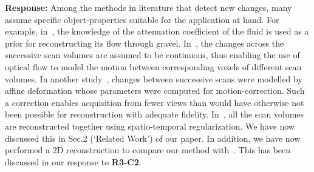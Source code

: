 \documentclass{article}
\begin{document}
\textbf{Response:} Among the methods in literature that detect new changes, many assume specific object-properties suitable for the application at hand.  For example, in~\cite{Van2015}, the knowledge of the attenuation coefficient of the fluid is used as a prior for reconstructing its flow through gravel. In~\cite{koen2020}, the changes across the successive scan volumes are assumed to be continuous, thus enabling the use of optical flow to model the motion between corresponding voxels of different scan volumes. In another study~\cite{vincent2017}, changes between successive scans were modelled by affine deformation whose parameters were computed for motion-correction. Such a correction enables acquisition from fewer views than would have otherwise not been possible for reconstruction with adequate fidelity. In~\cite{daniil2015}, all the scan volumes are reconstructed together using spatio-temporal regularization. We have now discussed this in Sec.2 (`Related Work') of our paper.
In addition, we have now performed a 2D reconstruction to compare our method with~\cite{Lee2012}. This has been discussed in our response to \textbf{R3-C2}.\\


\end{document}

